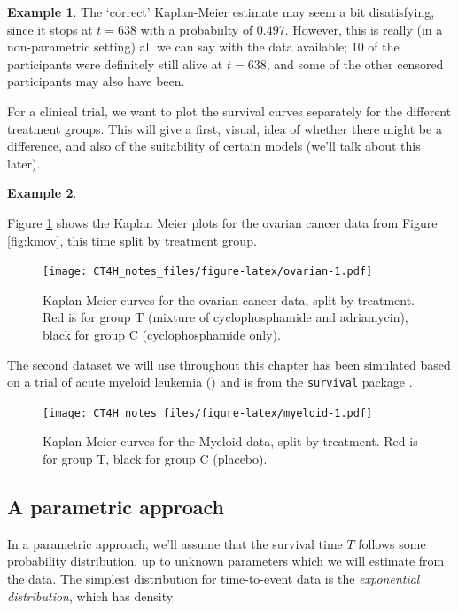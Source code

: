 \documentclass[
  openany]{book}
\theoremstyle{definition}
\theoremstyle{definition}
\newtheorem{example}{Example}[chapter]
\theoremstyle{definition}
\theoremstyle{definition}
\theoremstyle{remark}
\begin{document}
\begin{example}
The `correct' Kaplan-Meier estimate may seem a bit disatisfying, since it stops at \(t=638\) with a probabiilty of \(0.497\). However, this is really (in a non-parametric setting) all we can say with the data available; 10 of the participants were definitely still alive at \(t=638\), and some of the other censored participants may also have been.
\end{example}

For a clinical trial, we want to plot the survival curves separately for the different treatment groups. This will give a first, visual, idea of whether there might be a difference, and also of the suitability of certain models (we'll talk about this later).

\begin{example}
\protect\hypertarget{exm:veteranmyeloid}{}\label{exm:veteranmyeloid}

Figure \ref{fig:ovarian} shows the Kaplan Meier plots for the ovarian cancer data from Figure \ref{fig:kmov}, this time split by treatment group.

\begin{figure}
\centering
\texttt{[image: CT4H\_notes\_files/figure-latex/ovarian-1.pdf]}
\caption{\label{fig:ovarian}Kaplan Meier curves for the ovarian cancer data, split by treatment. Red is for group T (mixture of cyclophosphamide and adriamycin), black for group C (cyclophosphamide only).}
\end{figure}

The second dataset we will use throughout this chapter has been simulated based on a trial of acute myeloid leukemia (\citet{le2018application}) and is from the \texttt{survival} package \citet{survival-package}.

\begin{figure}
\centering
\texttt{[image: CT4H\_notes\_files/figure-latex/myeloid-1.pdf]}
\caption{\label{fig:myeloid}Kaplan Meier curves for the Myeloid data, split by treatment. Red is for group T, black for group C (placebo).}
\end{figure}

\end{example}

\hypertarget{a-parametric-approach}{%
\subsection{A parametric approach}\label{a-parametric-approach}}

In a parametric approach, we'll assume that the survival time \(T\) follows some probability distribution, up to unknown parameters which we will estimate from the data. The simplest distribution for time-to-event data is the \emph{exponential distribution}, which has density
\end{document}
